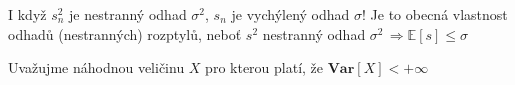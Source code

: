 \begin{remark}
I když $ s^{2}_{n} $ je nestranný odhad $ \sigma^{2} $, $ s_{n} $ je vychýlený odhad $ \sigma $!
Je to obecná vlastnost odhadů (nestranných) rozptylů, neboť $ s^{2} $ nestranný odhad $ \sigma^{2} \, \Rightarrow \mathbb{E}[s] \leq \sigma $ 
\end{remark}

Uvažujme náhodnou veličinu $ X $  pro kterou platí, že $ \textbf{Var} [ X ] < + \infty $





